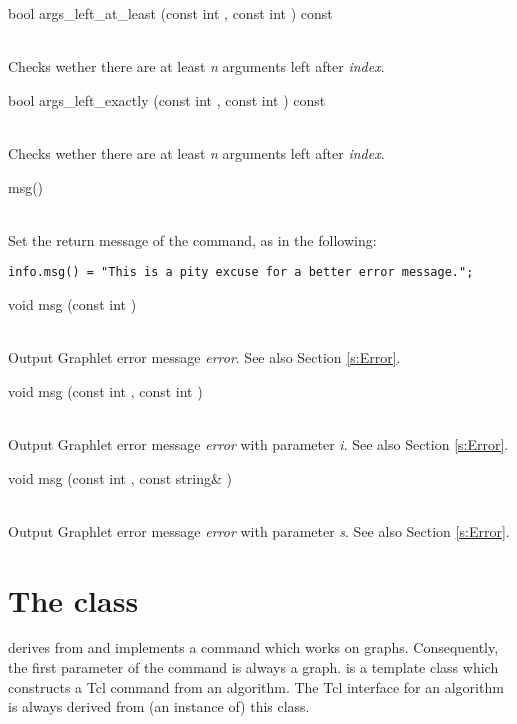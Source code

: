 \documentclass[twoside,fleqn]{report}
\begin{document}
\begin{Cdefinition}
  \item[bool args\_left\_at\_least (const int \Param{index},
  const int \Param{n}) const]
  \strut\\
  Checks wether there are at least \emph{n} arguments left after
  \emph{index}.
  
  \item[bool args\_left\_exactly (const int \Param{index},
  const int \Param{n}) const]
  \strut\\
  Checks wether there are at least \emph{n} arguments left after
  \emph{index}.

  \item[msg()]
  \strut\\
  Set the return message of the command, as in the following:
\begin{verbatim}
info.msg() = "This is a pity excuse for a better error message.";
\end{verbatim}
  
  \item[void msg (const int \Param{error})]
  \strut\\
  Output Graphlet error message \emph{error}. See also Section
  \ref{s:Error}.
  
  \item[void msg (const int \Param{error}, const int
  \Param{i})]
  \strut\\
  Output Graphlet error message \emph{error} with parameter
  \emph{i}. See also Section \ref{s:Error}.
  
  \item[void msg (const int \Param{error}, const string\&
  \Param{i})]
  \strut\\
  Output Graphlet error message \emph{error} with parameter
  \emph{s}. See also Section \ref{s:Error}.

\end{Cdefinition}

%
%

\section{The class }
\label{s:Tcl_Algorithm}


 derives from
 and implements a command which works on
graphs.  Consequently, the first parameter of the command is
always a graph.   is a template
class which constructs a Tcl command from an algorithm.  The Tcl
interface for an algorithm is always derived from (an instance
of) this class.
\end{document}
